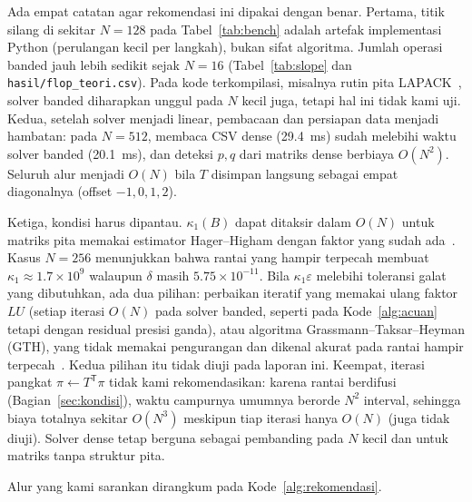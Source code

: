 \documentclass[12pt,a4paper]{article}
\newcommand{\T}{\mathsf{T}}
\numberwithin{equation}{section}
\begin{document}
Ada empat catatan agar rekomendasi ini dipakai dengan benar. Pertama, titik silang di sekitar $N=128$ pada
Tabel~\ref{tab:bench} adalah artefak implementasi Python (perulangan kecil per langkah), bukan sifat algoritma. Jumlah
operasi banded jauh lebih sedikit sejak $N=16$ (Tabel~\ref{tab:slope} dan \texttt{hasil/flop\_teori.csv}). Pada kode
terkompilasi, misalnya rutin pita LAPACK~\cite{lapack}, solver banded diharapkan unggul pada $N$ kecil juga, tetapi hal ini
tidak kami uji. Kedua, setelah solver menjadi linear, pembacaan dan persiapan data menjadi hambatan: pada $N=512$,
membaca CSV dense (29.4~ms) sudah melebihi waktu solver banded (20.1~ms), dan deteksi $p,q$ dari matriks dense berbiaya
$O(N^2)$. Seluruh alur menjadi $O(N)$ bila $T$ disimpan langsung sebagai empat diagonalnya (offset $-1,0,1,2$).

Ketiga, kondisi harus dipantau. $\kappa_1(B)$ dapat ditaksir dalam $O(N)$ untuk matriks pita memakai estimator
Hager--Higham dengan faktor yang sudah ada~\cite{higham}. Kasus $N=256$ menunjukkan bahwa rantai yang hampir terpecah
membuat $\kappa_1\approx1.7\times10^{9}$ walaupun $\delta$ masih $5.75\times10^{-11}$. Bila $\kappa_1\varepsilon$ melebihi
toleransi galat yang dibutuhkan, ada dua pilihan: perbaikan iteratif yang memakai ulang faktor $LU$ (setiap iterasi
$O(N)$ pada solver banded, seperti pada Kode~\ref{alg:acuan} tetapi dengan residual presisi ganda), atau algoritma
Grassmann--Taksar--Heyman (GTH), yang tidak memakai pengurangan dan dikenal akurat pada rantai hampir terpecah~\cite{gth}.
Kedua pilihan itu tidak diuji pada laporan ini. Keempat, iterasi pangkat $\pi\leftarrow T^\T\pi$ tidak kami
rekomendasikan: karena rantai berdifusi (Bagian~\ref{sec:kondisi}), waktu campurnya umumnya berorde $N^2$ interval,
sehingga biaya totalnya sekitar $O(N^3)$ meskipun tiap iterasi hanya $O(N)$ (juga tidak diuji). Solver dense tetap
berguna sebagai pembanding pada $N$ kecil dan untuk matriks tanpa struktur pita.

Alur yang kami sarankan dirangkum pada Kode~\ref{alg:rekomendasi}.
\end{document}
